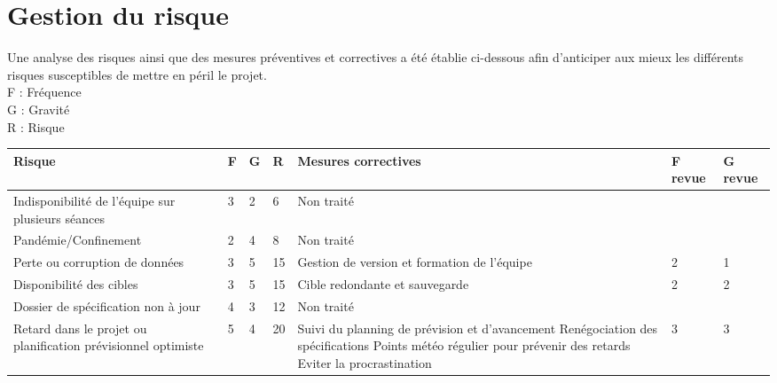 \documentclass[a4paper,11pt,titlepage]{article}
\begin{document}
\section{Gestion du risque}
Une analyse des risques ainsi que des mesures préventives et correctives a été établie ci-dessous
afin d'anticiper aux mieux les différents risques susceptibles de mettre en péril le projet.\\
F : Fréquence    \\
G : Gravité      \\
R : Risque       \\
\begin{table}[H]
    \begin{tabular}{|p{45mm}|p{3mm}|p{3mm}|p{3mm}|p{55mm}|p{13mm}|p{13mm}|}
        \hline
        \rowcolor[HTML]{CCCCCC}
        Risque                                                        & F   & G   & R  & Mesures correctives                         & F revue & G revue \\ \hline
        Indisponibilité de l'équipe sur plusieurs séances             & 3   & 2   & 6  & {Non traité}                                & {}      & {}      \\ \hline
        Pandémie/Confinement                                          & 2   & 4   & 8  & {Non traité}                                & {}      & {}      \\ \hline
        Perte ou corruption de données                                & 3   & 5   & 15 & Gestion de version et formation de l'équipe & {2}     & {1}     \\ \hline
        Disponibilité des cibles                                      & 3   & 5   & 15 & Cible redondante et sauvegarde              & {2}     & {2}     \\ \hline
        Dossier de spécification non à jour                           & 4   & 3   & 12 & {Non traité}                                & {}      & {}      \\ \hline
        Retard dans le projet ou planification prévisionnel optimiste & 5   & 4   & 20 & {
                Suivi du planning de prévision et d'avancement\newline
                Renégociation des spécifications\newline
                Points météo régulier pour prévenir des retards\newline
                Eviter la procrastination
        }                                                             & {3} & {3}                                                                        \\ \hline

\end{tabular}
\end{table}
\end{document}

